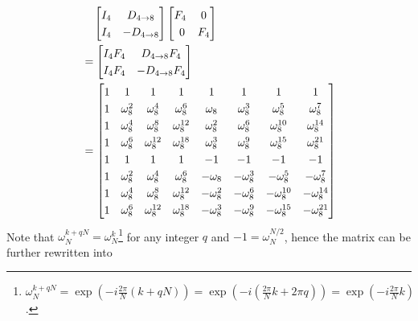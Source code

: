 \begin{align*}
&\quad \begin{bmatrix}
I_4 & D_{4 \to 8} \\
I_4 & -D_{4 \to 8}
\end{bmatrix}
\begin{bmatrix}
F_4 & 0 \\\
0 & F_4
\end{bmatrix} \\
&=
\begin{bmatrix}
I_4F_4 & D_{4 \to 8}F_4 \\
I_4F_4 & -D_{4 \to 8}F_4
\end{bmatrix} \\
&=
\renewcommand\arraystretch{1.25}
\begin{bmatrix}
1 & 1 & 1 & 1 & 1 & 1 & 1 & 1 \\
1 & \omega_8^2 & \omega_8^4 & \omega_8^6 & \omega_8 & \omega_8^3 & \omega_8^5 & \omega_8^7 \\
1 & \omega_8^4 & \omega_8^8 & \omega_8^{12} & \omega_8^2 & \omega_8^6 & \omega_8^{10} & \omega_8^{14} \\
1 & \omega_8^6 & \omega_8^{12} & \omega_8^{18} & \omega_8^3 & \omega_8^9 & \omega_8^{15} & \omega_8^{21} \\
1 & 1 & 1 & 1 & -1 & -1 & -1 & -1 \\
1 & \omega_8^2 & \omega_8^4 & \omega_8^6 & -\omega_8 & -\omega_8^3 & -\omega_8^5 & -\omega_8^7 \\
1 & \omega_8^4 & \omega_8^8 & \omega_8^{12} & -\omega_8^2 & -\omega_8^6 & -\omega_8^{10} & -\omega_8^{14} \\
1 & \omega_8^6 & \omega_8^{12} & \omega_8^{18} & -\omega_8^3 & -\omega_8^9 & -\omega_8^{15} & -\omega_8^{21} \\
\end{bmatrix}
\end{align*}
Note that $\omega_N^{k + qN} = \omega_N^k$\footnote{\label{foot:DFTcyclicexp}$\omega_N^{k + qN} = \exp(-i\frac{2\pi}{N}(k+qN)) = \exp(-i(\frac{2\pi}{N}k + 2\pi q)) = \exp(-i\frac{2\pi}{N}k)$.} for any integer $q$ and $-1 = \omega_N^{N/2}$, hence the matrix can be further rewritten into
